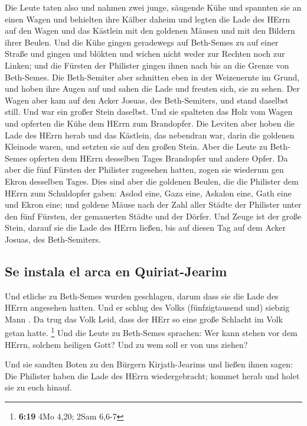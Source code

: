  Die Leute taten also und nahmen zwei junge, säugende
Kühe und spannten sie an einen Wagen und behielten ihre Kälber daheim
 und legten die Lade des HErrn auf den Wagen und das
Kästlein mit den goldenen Mäusen und mit den Bildern ihrer Beulen.
 Und die Kühe gingen geradewegs auf Beth-Semes zu auf
einer Straße und gingen und blökten und wichen nicht weder zur Rechten
noch zur Linken; und die Fürsten der Philister gingen ihnen nach bis an
die Grenze von Beth-Semes.  Die Beth-Semiter aber
schnitten eben in der Weizenernte im Grund, und hoben ihre Augen auf und
sahen die Lade und freuten sich, sie zu sehen.  Der Wagen
aber kam auf den Acker Josuas, des Beth-Semiters, und stand daselbst
still. Und war ein großer Stein daselbst. Und sie spalteten das Holz vom
Wagen und opferten die Kühe dem HErrn zum Brandopfer. 
Die Leviten aber hoben die Lade des HErrn herab und das Kästlein, das
nebendran war, darin die goldenen Kleinode waren, und setzten sie auf
den großen Stein. Aber die Leute zu Beth-Semes opferten dem HErrn
desselben Tages Brandopfer und andere Opfer.  Da aber die
fünf Fürsten der Philister zugesehen hatten, zogen sie wiederum gen
Ekron desselben Tages.  Dies sind aber die goldenen
Beulen, die die Philister dem HErrn zum Schuldopfer gaben: Asdod eine,
Gaza eine, Askalon eine, Gath eine und Ekron eine;  und
goldene Mäuse nach der Zahl aller Städte der Philister unter den fünf
Fürsten, der gemauerten Städte und der Dörfer. Und Zeuge ist der große
Stein, darauf sie die Lade des HErrn ließen, bis auf diesen Tag auf dem
Acker Josuas, des Beth-Semiters.

\hypertarget{se-instala-el-arca-en-quiriat-jearim}{%
\subsection{Se instala el arca en
Quiriat-Jearim}\label{se-instala-el-arca-en-quiriat-jearim}}

 Und etliche zu Beth-Semes wurden geschlagen, darum dass
sie die Lade des HErrn angesehen hatten. Und er schlug des Volks
(fünfzigtausend und) siebzig Mann . Da trug das Volk Leid, dass der HErr
so eine große Schlacht im Volk getan hatte. \footnote{\textbf{6:19} 4Mo
  4,20; 2Sam 6,6-7}  Und die Leute zu Beth-Semes
sprachen: Wer kann stehen vor dem HErrn, solchem heiligen Gott? Und zu
wem soll er von uns ziehen?

 Und sie sandten Boten zu den Bürgern Kirjath-Jearims und
ließen ihnen sagen: Die Philister haben die Lade des HErrn
wiedergebracht; kommet herab und holet sie zu euch hinauf.

